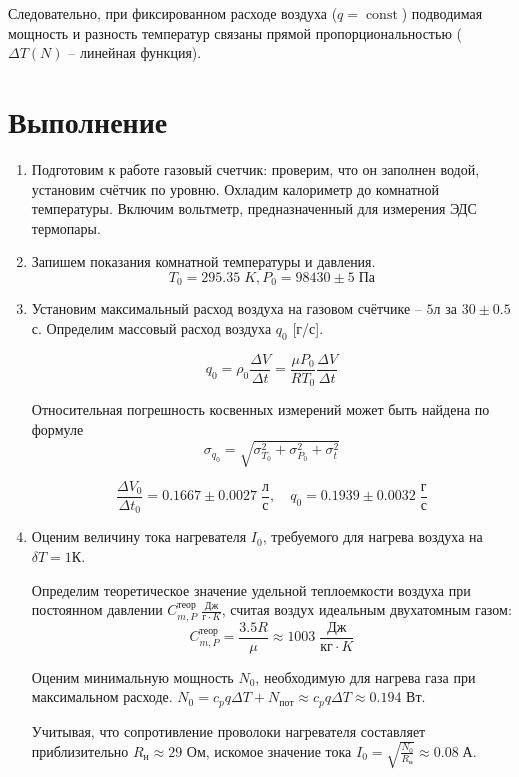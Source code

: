 \documentclass[a4paper,12pt]{article}
\DeclareMathOperator{\const}{\mathop{const}}
\begin{document}
	Следовательно, при фиксированном расходе воздуха ($q = \const$) подводимая мощность и разность температур связаны прямой пропорциональностью ($\Delta T(N)$ -- линейная функция).

	\section{Выполнение}
	
	\begin{enumerate}
		\item Подготовим к работе газовый счетчик: проверим, что он заполнен  водой, установим счётчик по уровню. Охладим калориметр до комнатной температуры. Включим вольтметр, предназначенный для измерения ЭДС термопары. 
		
		\item Запишем показания комнатной температуры и давления. $$T_{0} = 295.35 \; K, P_{0} = 98430 \pm 5 \; {Па} $$
		
		\item Установим максимальный расход воздуха на газовом счётчике -- $5$л за $30 \pm 0.5$с. Определим массовый расход воздуха $q_{0}$ [г/с].
		
		$$q_0 = \rho_0 \frac{\Delta V}{\Delta t} = \frac{\mu P_0}{RT_0} \frac{\Delta V}{\Delta t}$$
		
		Относительная погрешность косвенных измерений может быть найдена по формуле $$\sigma_{q_0} = \sqrt{\sigma_{T_0}^2 + \sigma_{P_0}^2 + \sigma_t^2}$$ 
		
		$$\frac{\Delta V_0}{\Delta t_0} = 0.1667\pm0.0027 \; \frac{л}{с} ,\quad  q_0 = 0.1939 \pm 0.0032 \; \frac{г}{с} $$
		
		\item Оценим величину тока нагревателя $I_{0}$, требуемого для нагрева воздуха на $\delta T = 1 {К}$.
		
		Определим теоретическое значение удельной теплоемкости воздуха при постоянном давлении $C_{m, P}^{теор} \; \frac{Дж}{г\cdot K}$, считая воздух идеальным двухатомным газом: $$C_{m, P}^{теор} = \frac{3.5R}{\mu} \approx 1003 \; \frac{Дж}{кг\cdot K}$$
		
		Оценим минимальную мощность $N_0$, необходимую для нагрева газа при максимальном расходе. $N_{0} = c_{p}q\Delta T + N_{пот} \approx c_{p}q\Delta T \approx 0.194$ Вт.
		
		Учитывая, что сопротивление проволоки нагревателя составляет приблизительно $R_{н} \approx 29$ Ом, искомое значение тока $I_{0} = \sqrt{\frac{N_{0}}{R_{н}}} \approx 0.08 \; {А}.$
		

\end{enumerate}
\end{document}
